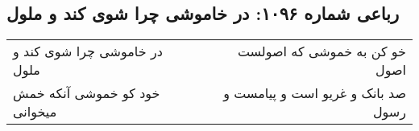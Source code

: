 \begin{center}
\section*{رباعی شماره ۱۰۹۶: در خاموشی چرا شوی کند و ملول}
\label{sec:1096}
\begin{longtable}{l p{0.5cm} r}
در خاموشی چرا شوی کند و ملول
&&
خو کن به خموشی که اصولست اصول
\\
خود کو خموشی آنکه خمش میخوانی
&&
صد بانک و غریو است و پیامست و رسول
\\
\end{longtable}
\end{center}
